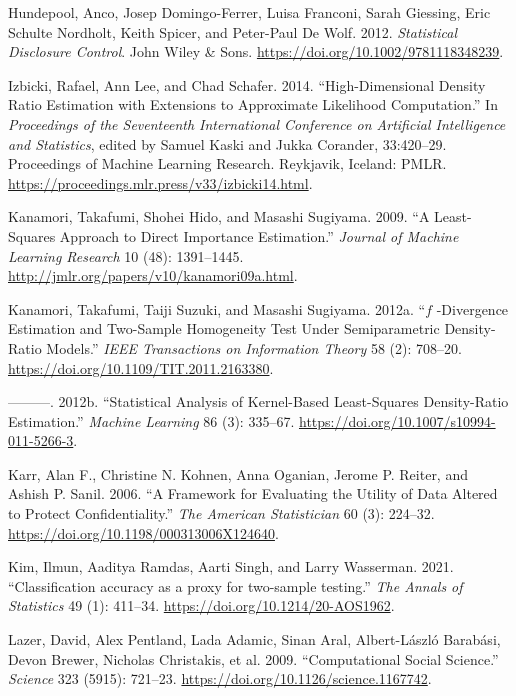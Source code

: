\documentclass[
]{article}
\newlength{\cslhangindent}
\newenvironment{CSLReferences}[2] %
 {\begin{list}{}{%
  \setlength{\itemindent}{0pt}
  \setlength{\leftmargin}{0pt}
  \setlength{\parsep}{0pt}
  \ifodd #1
   \setlength{\leftmargin}{\cslhangindent}
   \setlength{\itemindent}{-1\cslhangindent}
  \fi
  \setlength{\itemsep}{#2\baselineskip}}}
 {\end{list}}
\begin{document}
\begin{CSLReferences}{1}{0}
Hundepool, Anco, Josep Domingo-Ferrer, Luisa Franconi, Sarah Giessing,
Eric Schulte Nordholt, Keith Spicer, and Peter-Paul De Wolf. 2012.
\emph{Statistical Disclosure Control}. John Wiley \& Sons.
\url{https://doi.org/10.1002/9781118348239}.

Izbicki, Rafael, Ann Lee, and Chad Schafer. 2014. {``{High-Dimensional
Density Ratio Estimation with Extensions to Approximate Likelihood
Computation}.''} In \emph{Proceedings of the Seventeenth International
Conference on Artificial Intelligence and Statistics}, edited by Samuel
Kaski and Jukka Corander, 33:420--29. Proceedings of Machine Learning
Research. Reykjavik, Iceland: PMLR.
\url{https://proceedings.mlr.press/v33/izbicki14.html}.

Kanamori, Takafumi, Shohei Hido, and Masashi Sugiyama. 2009. {``A
Least-Squares Approach to Direct Importance Estimation.''} \emph{Journal
of Machine Learning Research} 10 (48): 1391--1445.
\url{http://jmlr.org/papers/v10/kanamori09a.html}.

Kanamori, Takafumi, Taiji Suzuki, and Masashi Sugiyama. 2012a. {``\(f\)
-Divergence Estimation and Two-Sample Homogeneity Test Under
Semiparametric Density-Ratio Models.''} \emph{IEEE Transactions on
Information Theory} 58 (2): 708--20.
\url{https://doi.org/10.1109/TIT.2011.2163380}.

---------. 2012b. {``Statistical Analysis of Kernel-Based Least-Squares
Density-Ratio Estimation.''} \emph{Machine Learning} 86 (3): 335--67.
\url{https://doi.org/10.1007/s10994-011-5266-3}.

Karr, Alan F., Christine N. Kohnen, Anna Oganian, Jerome P. Reiter, and
Ashish P. Sanil. 2006. {``A Framework for Evaluating the Utility of Data
Altered to Protect Confidentiality.''} \emph{The American Statistician}
60 (3): 224--32. \url{https://doi.org/10.1198/000313006X124640}.

Kim, Ilmun, Aaditya Ramdas, Aarti Singh, and Larry Wasserman. 2021.
{``{Classification accuracy as a proxy for two-sample testing}.''}
\emph{The Annals of Statistics} 49 (1): 411--34.
\url{https://doi.org/10.1214/20-AOS1962}.

Lazer, David, Alex Pentland, Lada Adamic, Sinan Aral, Albert-László
Barabási, Devon Brewer, Nicholas Christakis, et al. 2009.
{``Computational Social Science.''} \emph{Science} 323 (5915): 721--23.
\url{https://doi.org/10.1126/science.1167742}.


\end{CSLReferences}
\end{document}

